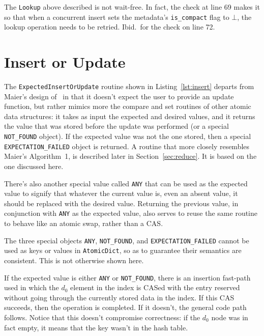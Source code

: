 The \texttt{Lookup} above described is not wait-free.
In fact, the check at line 69 makes it so that when a concurrent insert sets the metadata's \texttt{{is\_compact}} flag to $\bot$, the lookup operation needs to be retried.
Ibid.\ for the check on line 72.




\section{Insert or Update}\label{sec:insert-or-update}

The \texttt{ExpectedInsertOrUpdate} routine shown in Listing~\ref{lst:insert} departs from Maier's design of~\cite[Algorithm~1]{maier} in that it doesn't expect the user to provide an update function, but rather mimics more the compare and set routines of other atomic data structures: it takes as input the expected and desired values, and it returns the value that was stored before the update was performed (or a special \texttt{{NOT\_FOUND}} object).
If the expected value was not the one stored, then a special \texttt{{EXPECTATION\_FAILED}} object is returned.
A routine that more closely resembles Maier's Algorithm~1, is described later in Section~\ref{sec:reduce}.
It is based on the one discussed here.

There's also another special value called \texttt{ANY} that can be used as the expected value to signify that whatever the current value is, even an absent value, it should be replaced with the desired value.
Returning the previous value, in conjunction with \texttt{ANY} as the expected value, also serves to reuse the same routine to behave like an atomic swap, rather than a CAS\@.

The three special objects \texttt{{ANY}}, \texttt{{NOT\_FOUND}}, and \texttt{{EXPECTATION\_FAILED}} cannot be used as keys or values in \texttt{AtomicDict}, so as to guarantee their semantics are consistent.
This is not otherwise shown here.

If the expected value is either \texttt{{ANY}} or \texttt{{NOT\_FOUND}}, there is an insertion fast-path used in which the $d_0$ element in the index is CASed with the entry reserved without going through the currently stored data in the index.
If this CAS succeeds, then the operation is completed.
If it doesn't, the general code path follows.
Notice that this doesn't compromise correctness: if the $d_0$ node was in fact empty, it means that the key wasn't in the hash table.

